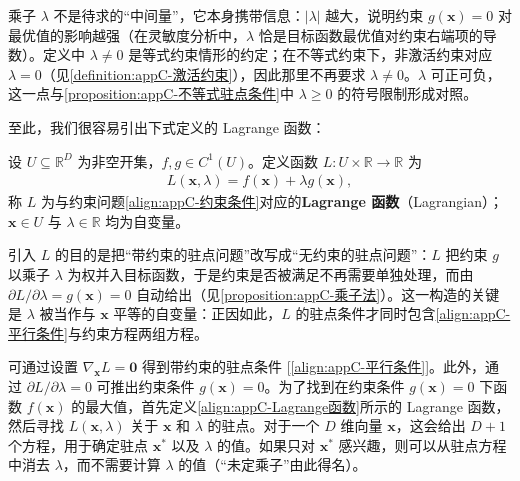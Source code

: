 \documentclass[../main.tex]{subfiles}
\begin{document}
\begin{remark}
乘子 $\lambda$ 不是待求的“中间量”，它本身携带信息：$|\lambda|$ 越大，说明约束 $g(\bm{x})=0$ 对最优值的影响越强（在灵敏度分析中，$\lambda$ 恰是目标函数最优值对约束右端项的导数）。定义中 $\lambda\neq0$ 是等式约束情形的约定；在不等式约束下，非激活约束对应 $\lambda=0$（见\cref{definition:appC-激活约束}），因此那里不再要求 $\lambda\neq0$。$\lambda$ 可正可负，这一点与\cref{proposition:appC-不等式驻点条件}中 $\lambda\geqslant0$ 的符号限制形成对照。
\end{remark}

至此，我们很容易引出下式定义的 Lagrange 函数：
\begin{definition}[Lagrange 函数]\label{definition:appC-乘子函数}
设 $U\subseteq\mathbb{R}^{D}$ 为非空开集，$f,g\in C^{1}(U)$。定义函数 $L:U\times\mathbb{R}\to\mathbb{R}$ 为
\begin{align}
  L(\bm{x},\lambda)=f(\bm{x})+\lambda g(\bm{x}),
  \label{align:appC-Lagrange函数}
\end{align}
称 $L$ 为与约束问题\eqref{align:appC-约束条件}对应的\textbf{Lagrange 函数}（Lagrangian）；$\bm{x}\in U$ 与 $\lambda\in\mathbb{R}$ 均为自变量。
\end{definition}

\begin{remark}
引入 $L$ 的目的是把“带约束的驻点问题”改写成“无约束的驻点问题”：$L$ 把约束 $g$ 以乘子 $\lambda$ 为权并入目标函数，于是约束是否被满足不再需要单独处理，而由 $\partial L/\partial\lambda=g(\bm{x})=0$ 自动给出（见\cref{proposition:appC-乘子法}）。这一构造的关键是 $\lambda$ 被当作与 $\bm{x}$ 平等的自变量：正因如此，$L$ 的驻点条件才同时包含\eqref{align:appC-平行条件}与约束方程两组方程。
\end{remark}

可通过设置 $\nabla_{\bm{x}}L=\bm{0}$ 得到带约束的驻点条件 [\eqref{align:appC-平行条件}]。此外，通过 $\partial L/\partial\lambda=0$ 可推出约束条件 $g(\bm{x})=0$。为了找到在约束条件 $g(\bm{x})=0$ 下函数 $f(\bm{x})$ 的最大值，首先定义\eqref{align:appC-Lagrange函数}所示的 Lagrange 函数，然后寻找 $L(\bm{x},\lambda)$ 关于 $\bm{x}$ 和 $\lambda$ 的驻点。对于一个 $D$ 维向量 $\bm{x}$，这会给出 $D+1$ 个方程，用于确定驻点 $\bm{x}^{*}$ 以及 $\lambda$ 的值。如果只对 $\bm{x}^{*}$ 感兴趣，则可以从驻点方程中消去 $\lambda$，而不需要计算 $\lambda$ 的值（“未定乘子”由此得名）。
\end{document}
